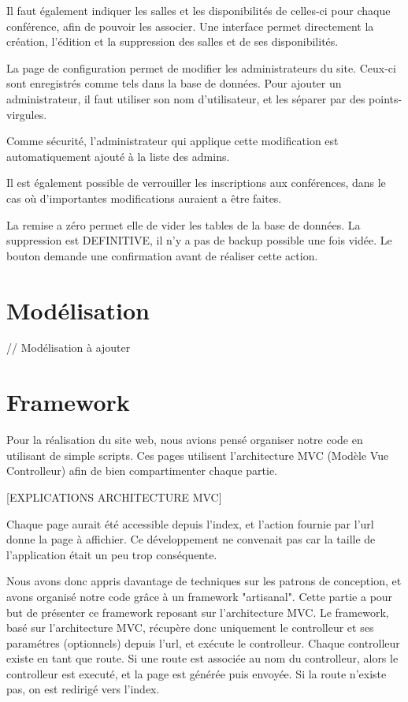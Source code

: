     Il faut également indiquer les salles et les disponibilités de celles-ci pour chaque conférence, afin de pouvoir les associer.
    Une interface permet directement la création, l'édition et la suppression des salles et de ses disponibilités.

    La page de configuration permet de modifier les administrateurs du site. Ceux-ci sont enregistrés comme tels dans la base de données.
    Pour ajouter un administrateur, il faut utiliser son nom d'utilisateur, et les séparer par des points-virgules.

    Comme sécurité, l'administrateur qui applique cette modification est automatiquement ajouté à la liste des admins.

    Il est également possible de verrouiller les inscriptions aux conférences, dans le cas où d'importantes modifications
    auraient a être faites.

    La remise a zéro permet elle de vider les tables de la base de données. La suppression est DEFINITIVE, il n'y a pas de
    backup possible une fois vidée. Le bouton demande une confirmation avant de réaliser cette action.

    \section{Modélisation}

        // Modélisation à ajouter
    \section{Framework}

    Pour la réalisation du site web, nous avions pensé organiser notre code en utilisant de simple scripts.
    Ces pages utilisent l'architecture MVC (Modèle Vue Controlleur) afin de bien compartimenter chaque partie.

    [EXPLICATIONS ARCHITECTURE MVC]

    Chaque page aurait été accessible depuis l'index, et l'action fournie par l'url donne la page à affichier.
    Ce développement ne convenait pas car la taille de l'application était un peu trop conséquente.

    Nous avons donc appris davantage de techniques sur les patrons de conception, et avons organisé notre code
    grâce à un framework "artisanal". Cette partie a pour but de présenter ce framework reposant sur l'architecture MVC.
    Le framework, basé sur l'architecture MVC, récupère donc uniquement le controlleur et ses paramétres (optionnels) depuis
    l'url, et exécute le controlleur. Chaque controlleur existe en tant que route. Si une route est associée au nom du controlleur,
    alors le controlleur est executé, et la page est générée puis envoyée. Si la route n'existe pas, on est redirigé vers l'index.

